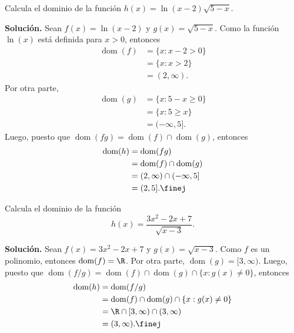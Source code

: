 \documentclass[12pt,a4paper]{book}
\DeclareMathOperator{\dom}{dom}
\begin{document}
    \begin{ejemplo}\label{ejm:18}
        Calcula el dominio de la función $h(x)=\ln(x-2)\sqrt{5-x}$.

        \textbf{Solución.} Sean $f(x)=\ln(x-2)$ y $g(x)=\sqrt{5-x}$. Como la función
        $\ln(x)$ está definida para $x>0$, entonces
        \begin{align*}
            \dom(f)&=\{x:x-2>0\}\\
            &=\{x:x>2\}\\
            &=(2,\infty).
        \end{align*}
        Por otra parte,
        \begin{align*}
            \dom(g)&=\{x:5-x\geq 0\}\\
            &=\{x:5\geq x\}\\
            &=(-\infty,5].
        \end{align*}
        Luego, puesto que $\dom(fg)=\dom(f)\cap\dom(g)$, entonces
        \begin{align*}
            \dom(h)&=\dom(fg)\\
            &=\dom(f)\cap\dom(g)\\
            &=(2,\infty)\cap(-\infty,5]\\
            &=(2,5].\finej
        \end{align*}
    \end{ejemplo}

    \begin{ejemplo}\label{ejm:19}
        Calcula el dominio de la función
        \begin{equation*}
            h(x)=\frac{3x^{2}-2x+7}{\sqrt{x-3}}.
        \end{equation*}

        \textbf{Solución.} Sean $f(x)=3x^{2}-2x+7$ y $g(x)=\sqrt{x-3}$. Como $f$ es un
        polinomio, entonces $\dom(f)=\R$. Por otra parte, $\dom(g)=[3,\infty)$. Luego,
        puesto que $\dom(f/g)=\dom(f)\cap\dom(g)\cap\{x:g(x)\neq 0\}$, entonces
        \begin{align*}
            \dom(h)&=\dom(f/g)\\
            &=\dom(f)\cap\dom(g)\cap\{x:g(x)\neq 0\}\\
            &=\R\cap[3,\infty)\cap(3,\infty)\\
            &=(3,\infty).\finej
        \end{align*}
    \end{ejemplo}
\end{document}
